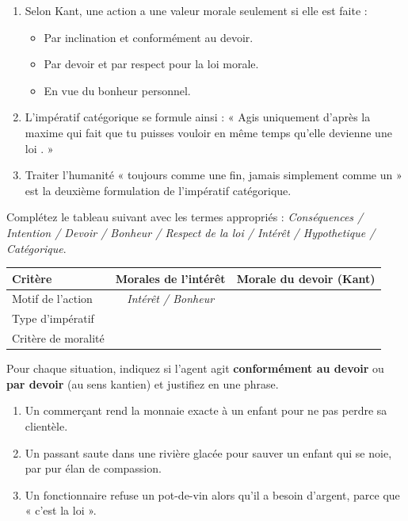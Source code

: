 \documentclass[11pt]{article}
\begin{document}
\begin{exercice}
\begin{enumerate}
    \item Selon Kant, une action a une valeur morale seulement si elle est faite :
    \begin{itemize}
        \item[A.] Par inclination et conformément au devoir.
        \item[B.] Par devoir et par respect pour la loi morale.
        \item[C.] En vue du bonheur personnel.
    \end{itemize}
    \item L'impératif catégorique se formule ainsi : « Agis uniquement d'après la maxime qui fait que tu puisses vouloir en même temps qu'elle devienne une loi \underline{\hspace{3cm}}. »
    \item Traiter l'humanité « toujours comme une fin, jamais simplement comme un \underline{\hspace{2cm}} » est la deuxième formulation de l'impératif catégorique.
\end{enumerate}
\end{exercice}

\begin{exercice}
Complétez le tableau suivant avec les termes appropriés : \textit{Conséquences / Intention / Devoir / Bonheur / Respect de la loi / Intérêt / Hypothetique / Catégorique}.

\begin{center}
\begin{tabular}{|l|c|c|}
\hline
\textbf{Critère} & \textbf{Morales de l'intérêt} & \textbf{Morale du devoir (Kant)} \\
\hline
Motif de l'action & \textit{Intérêt / Bonheur} &  \\
\hline
Type d'impératif &  &  \\
\hline
Critère de moralité &  &  \\
\hline
\end{tabular}
\end{center}
\end{exercice}

\begin{exercice}
Pour chaque situation, indiquez si l'agent agit \textbf{conformément au devoir} ou \textbf{par devoir} (au sens kantien) et justifiez en une phrase.
\begin{enumerate}
    \item Un commerçant rend la monnaie exacte à un enfant pour ne pas perdre sa clientèle.
    \item Un passant saute dans une rivière glacée pour sauver un enfant qui se noie, par pur élan de compassion.
    \item Un fonctionnaire refuse un pot-de-vin alors qu'il a besoin d'argent, parce que « c'est la loi ».
\end{enumerate}
\end{exercice}
\end{document}

